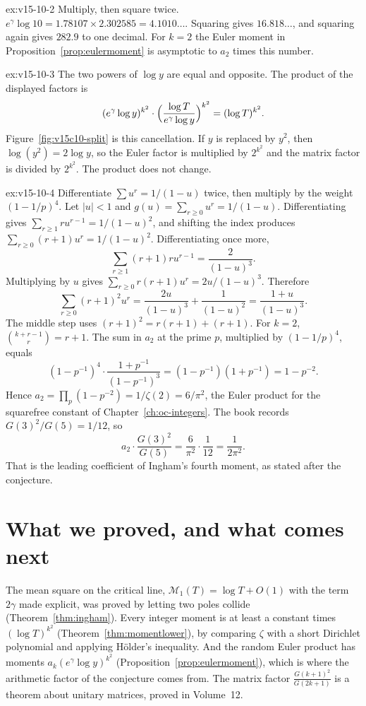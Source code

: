 \begin{solution}{ex:v15-10-2}
\idea Multiply, then square twice.
\writeup \(e^{\gamma}\log10=1.78107\times2.302585=4.1010\ldots\). Squaring gives \(16.818\ldots\), and squaring again gives \(282.9\) to one decimal. For \(k=2\) the Euler moment in Proposition~\ref{prop:eulermoment} is asymptotic to \(a_2\) times this number.
\end{solution}

\begin{solution}{ex:v15-10-3}
\idea The two powers of \(\log y\) are equal and opposite.
\writeup The product of the displayed factors is
\[
(e^{\gamma}\log y)^{k^2}\cdot\Bigl(\frac{\log T}{e^{\gamma}\log y}\Bigr)^{k^2}=(\log T)^{k^2}.
\]
Figure~\ref{fig:v15c10-split} is this cancellation. If \(y\) is replaced by \(y^2\), then \(\log(y^2)=2\log y\), so the Euler factor is multiplied by \(2^{k^2}\) and the matrix factor is divided by \(2^{k^2}\). The product does not change.
\end{solution}

\begin{solution}{ex:v15-10-4}
\idea Differentiate \(\sum u^r=1/(1-u)\) twice, then multiply by the weight \((1-1/p)^{4}\).
\writeup Let \(|u|<1\) and \(g(u)=\sum_{r\ge0}u^r=1/(1-u)\). Differentiating gives \(\sum_{r\ge1}ru^{r-1}=1/(1-u)^2\), and shifting the index produces \(\sum_{r\ge0}(r+1)u^r=1/(1-u)^2\). Differentiating once more,
\[
\sum_{r\ge1}(r+1)ru^{r-1}=\frac2{(1-u)^3}.
\]
Multiplying by \(u\) gives \(\sum_{r\ge0}r(r+1)u^r=2u/(1-u)^3\). Therefore
\[
\sum_{r\ge0}(r+1)^2u^r
=\frac{2u}{(1-u)^3}+\frac1{(1-u)^2}
=\frac{1+u}{(1-u)^3}.
\]
The middle step uses \((r+1)^2=r(r+1)+(r+1)\).
For \(k=2\), \(\binom{k+r-1}{r}=r+1\). The sum in \(a_2\) at the prime \(p\), multiplied by \((1-1/p)^4\), equals
\[
(1-p^{-1})^4\cdot\frac{1+p^{-1}}{(1-p^{-1})^3}=(1-p^{-1})(1+p^{-1})=1-p^{-2}.
\]
Hence \(a_2=\prod_p(1-p^{-2})=1/\zeta(2)=6/\pi^2\), the Euler product for the squarefree constant of Chapter~\ref{ch:oc-integers}. The book records \(G(3)^2/G(5)=1/12\), so
\[
a_2\cdot\frac{G(3)^2}{G(5)}=\frac{6}{\pi^2}\cdot\frac1{12}=\frac1{2\pi^2}.
\]
That is the leading coefficient of Ingham's fourth moment, as stated after the conjecture.
\end{solution}

\section{What we proved, and what comes next}

The mean square on the critical line, $\mathcal M_1(T)=\log T+O(1)$ with the term $2\gamma$ made explicit, was proved by letting two poles collide (Theorem~\ref{thm:ingham}). Every integer moment is at least a constant times $(\log T)^{k^2}$ (Theorem~\ref{thm:momentlower}), by comparing $\zeta$ with a short Dirichlet polynomial and applying Hölder's inequality. And the random Euler product has moments $a_k(e^\gamma\log y)^{k^2}$ (Proposition~\ref{prop:eulermoment}), which is where the arithmetic factor of the conjecture comes from. The matrix factor $\frac{G(k+1)^2}{G(2k+1)}$ is a theorem about unitary matrices, proved in Volume~12.

